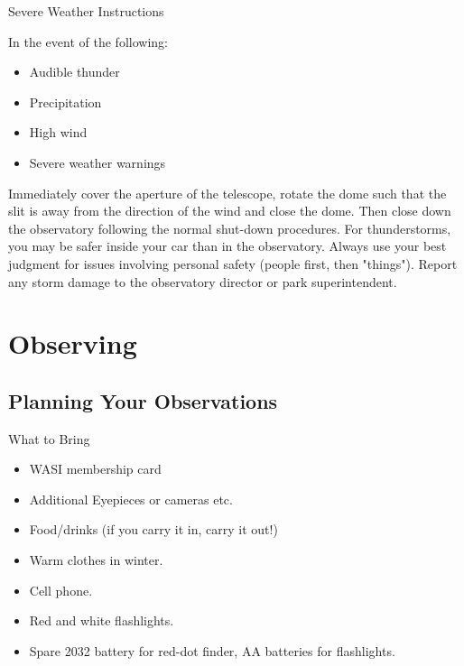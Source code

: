 \begin{frame}[t]{Severe Weather Instructions}
   
  In the event of the following:
    \begin{itemize}
      \item Audible thunder
      \item Precipitation
      \item High wind
      \item Severe weather warnings
    \end{itemize}

    Immediately cover the aperture of the telescope, rotate the dome such that the slit is away from the direction of the wind and close the dome.  Then close down the observatory following the normal shut-down procedures.
    For thunderstorms, you may be safer inside your car than in the observatory. Always use your best judgment for issues involving personal safety (people first, then "things").
    Report any storm damage to the observatory director or park superintendent.
\end{frame}

\section{Observing}

\subsection{Planning Your Observations}

\begin{frame}{What to Bring}
  \Large
  \begin{itemize}
    \item WASI membership card
    \item Additional Eyepieces or cameras etc.
    \item Food/drinks (if you carry it in, carry it out!)
    \item Warm clothes in winter.
    \item Cell phone.
    \item Red and white flashlights.
    \item Spare 2032 battery for red-dot finder, AA batteries for flashlights.
  \end{itemize}
\end{frame}

